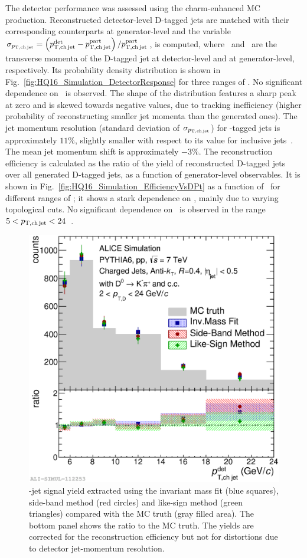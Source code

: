 \documentclass[a4paper]{jpconf}
\begin{document}
The detector performance was assessed using the charm-enhanced MC production. 
Reconstructed detector-level D-tagged jets are matched with their corresponding counterparts at generator-level and the variable
$\sigma_{p_{\mathrm{T,ch\, jet}}}=\left( p_{\mathrm{T,ch\,jet}}^{\mathrm{det}} - p_{\mathrm{T,ch\,jet}}^{\mathrm{part}} \right) / p_{\mathrm{T,ch\,jet}}^{\mathrm{part}}$,
is computed,
where \ptchjetdet\ and \ptchjetgen\ are the transverse momenta of the D-tagged jet at detector-level and at generator-level, respectively.
Its probability density distribution is shown in Fig.~\ref{fig:HQ16_Simulation_DetectorResponse} for three ranges of \ptchjetgen. No significant dependence on \ptchjetgen\ is observed.
The shape of the distribution features a sharp peak at zero and is skewed towards negative values, due to tracking inefficiency (higher probability of
reconstructing smaller jet momenta than the generated ones). The jet momentum resolution (standard deviation of $\sigma_{p_{\mathrm{T,ch\, jet}}}$) for \Dzero-tagged jets is approximately \mbox{$11$\%}, 
slightly smaller with respect to its value for inclusive jets~\cite{ALICE:2015e}. The mean jet momentum shift is approximately \mbox{$-3$\%}.
The reconstruction efficiency is calculated as the ratio of the yield of reconstructed D-tagged jets over all generated D-tagged jets, as a function of generator-level observables.
It is shown in Fig.~\ref{fig:HQ16_Simulation_EfficiencyVsDPt} as a function of \ptd\ for different ranges of \ptchjet; it shows a stark dependence on \ptd, mainly due to
varying topological cuts. No significant dependence on \ptchjet\ is observed in the range $5<p_{\mathrm{T,ch\, jet}}<24$~\GeVc.

\begin{figure}[tb]
\includegraphics[width=.50\textwidth]{img/HQ16_Simulation_MethodComparison}\hspace{1pc}%
\begin{minipage}[b]{.50\textwidth}\caption{\label{fig:HQ16_Simulation_MethodComparison}\Dzero-jet signal yield extracted using the invariant mass fit (blue squares), side-band method (red circles) and like-sign method (green triangles)
compared with the MC truth (gray filled area). The bottom panel shows the ratio to the MC truth. The yields are corrected for the reconstruction efficiency but not for distortions due to detector jet-momentum resolution.}
\end{minipage}
\end{figure}
\end{document}
